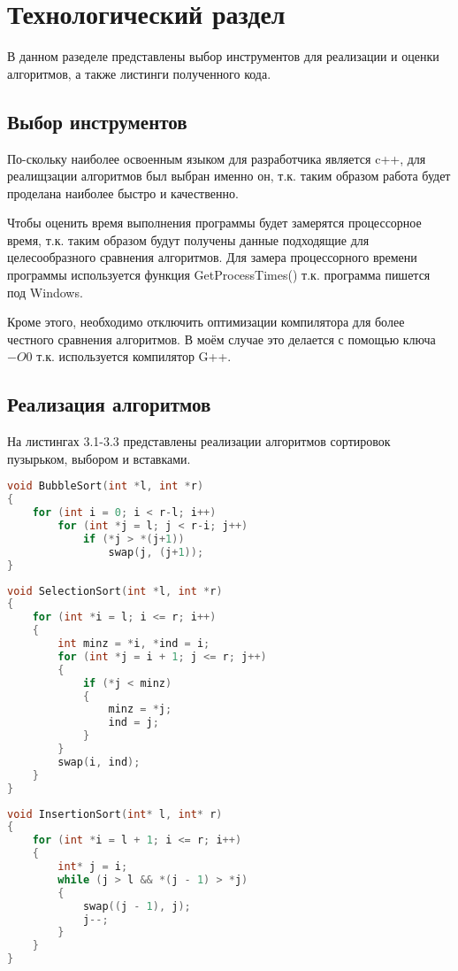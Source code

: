 \chapter{Технологический раздел}
В данном разеделе представлены выбор инструментов для реализации и оценки алгоритмов, а также листинги полученного кода.
\section{Выбор инструментов}
По-скольку наиболее освоенным языком для разработчика является c++, для реалищзации алгоритмов был выбран именно он, т.к. таким образом работа будет проделана наиболее быстро и качественно.

Чтобы оценить время выполнения программы будет замерятся процессорное время, т.к. таким образом будут получены данные подходящие для целесообразного сравнения алгоритмов. Для замера процессорного времени программы используется функция GetProcessTimes() т.к. программа пишется под Windows. \cite{get_proccess_times}

Кроме этого, необходимо отключить оптимизации компилятора для более честного сравнения алгоритмов. В моём случае это делается с помощью ключа $-O0$ т.к. используется компилятор G++. \cite{optimization}

\section{Реализация алгоритмов}
На листингах 3.1-3.3 представлены реализации алгоритмов сортировок пузырьком, выбором и вставками.

\begin{lstlisting}[language=c++, caption=Реализация алгоритма сортировки пузырьком]
void BubbleSort(int *l, int *r)
{
	for (int i = 0; i < r-l; i++)
		for (int *j = l; j < r-i; j++)
			if (*j > *(j+1))
				swap(j, (j+1));
}
\end{lstlisting}

\begin{lstlisting}[language=c++, caption=Реализация алгоритма сортировки выбором]
void SelectionSort(int *l, int *r)
{
	for (int *i = l; i <= r; i++)
	{
		int minz = *i, *ind = i;
		for (int *j = i + 1; j <= r; j++)
		{
			if (*j < minz)
			{
				minz = *j;
				ind = j;
			}
		}
		swap(i, ind);
	}
}
\end{lstlisting}

\begin{lstlisting}[language=c++, caption=Реализация алгоритма сортировки вставками]
void InsertionSort(int* l, int* r)
{
	for (int *i = l + 1; i <= r; i++)
	{
		int* j = i;
		while (j > l && *(j - 1) > *j)
		{
			swap((j - 1), j);
			j--;
		}
	}
}
\end{lstlisting}


